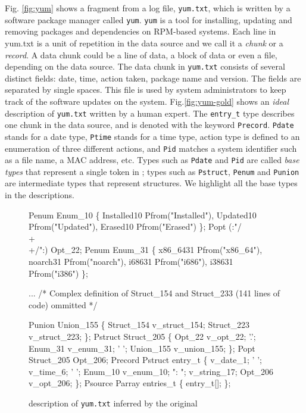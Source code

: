 Fig. \ref{fig:yum} shows a fragment from a log file, {\tt yum.txt},
which is written by a software package manager called {\tt yum}. {\tt yum} 
is a tool for installing, updating and removing packages and dependencies
on RPM-based systems. 
Each line in yum.txt is a unit of
repetition in the data source and we call it a {\em chunk} or
a {\em record}. A data chunk could be a line of data, a block of data or
even a file, depending on the data source.
The data chunk in {\tt yum.txt} consists of several distinct fields: 
date, time, action taken,
package name and version. The fields are separated by single spaces.
This file is used by system administrators to keep track of the
software updates on the system. 
Fig.\ref{fig:yum-gold} shows an {\em ideal} \pads{} description of
{\tt yum.txt} written by a human expert.
The {\tt entry\_t} type describes one chunk in the data source, and is
denoted with the keyword {\tt Precord}. 
{\tt Pdate} stands for a date type, {\tt Ptime} stands for a time type,
action type is defined to an enumeration of three different actions,
and {\tt Pid} matches a system identifier such as a file
name, a MAC address, etc. Types such as {\tt Pdate} and {\tt Pid}
are called {\em base types} that represent a single token 
in \pads{}; types such as {\tt Pstruct}, {\tt Penum} and {\tt Punion} are 
intermediate types that represent
structures. We highlight all the base types in the \pads{} descriptions. 
 
\begin{figure}[t]
\begin{centercode}
Penum Enum_10 \{
  Installed10 Pfrom("Installed"),
  Updated10 Pfrom("Updated"),
  Erased10 Pfrom("Erased")
\};
Popt (:"/\\+\\+/":) Opt_22;
Penum Enum_31 \{
  x86_6431 Pfrom("x86_64"),
  noarch31 Pfrom("noarch"),
  i68631 Pfrom("i686"),
  i38631 Pfrom("i386")
\};

... /* Complex definition of Struct_154 and Struct_233 
       (141 lines of code) ommitted */

Punion Union_155 \{
  Struct_154  v_struct_154;
  Struct_223  v_struct_223;
\};
Pstruct Struct_205 \{
       Opt_22  v_opt_22;
  '.'; Enum_31  v_enum_31;
  ' '; Union_155  v_union_155;
\};
Popt Struct_205 Opt_206;
Precord Pstruct entry_t \{
          v_date_1;
  ' ';    v_time_6;
  ' ';  Enum_10  v_enum_10;
  ": ";  v_string_17;
        Opt_206  v_opt_206;
\};
Psource Parray entries_t \{
        entry_t[];
\};

\end{centercode}
\caption{\pads{} description of {\tt yum.txt} inferred by the original \learnpads}\label{fig:yum-bad}
\end{figure}

